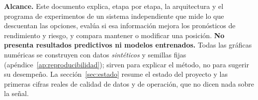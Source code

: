\documentclass[11pt,letterpaper,oneside]{article}
\begin{document}
\begin{titlepage}
\vfill
\begin{tcolorbox}[enhanced,boxrule=0pt,arc=0pt,colback=grisfondo,borderline west={2.2pt}{0pt}{qazul},
  left=10pt,right=10pt,top=8pt,bottom=8pt]
\small\sffamily
\textbf{Alcance.} Este documento explica, etapa por etapa, la arquitectura y el programa de
experimentos de un sistema independiente que mide lo que descuentan las opciones, evalúa si esa
información mejora los pronósticos de rendimiento y riesgo, y compara mantener o modificar una posición.
\textbf{No presenta resultados predictivos ni modelos entrenados.} Todas las gráficas numéricas se
construyen con datos \emph{sintéticos} y semillas fijas (apéndice~\ref{ap:reproducibilidad}); sirven para
explicar el método, no para sugerir su desempeño. La sección~\ref{sec:estado} resume el estado del proyecto
y las primeras cifras reales de calidad de datos y de operación, que no dicen nada sobre la señal.
\end{tcolorbox}
\end{titlepage}

\setcounter{page}{2}
{\hypersetup{linkcolor=tinta}
\renewcommand{\contentsname}{Contenido}
\linespread{1.0}\selectfont
\tableofcontents}
\clearpage
{}














\appendix


\clearpage

\end{document}
